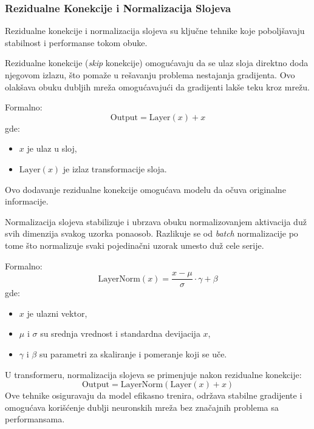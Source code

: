 \documentclass[12pt]{article}
\begin{document}
   \subsubsection*{Rezidualne Konekcije i Normalizacija Slojeva}

   Rezidualne konekcije i normalizacija slojeva su ključne tehnike koje poboljšavaju 
   stabilnost i performanse tokom obuke.

   Rezidualne konekcije (\textit{skip} konekcije) omogućavaju da se ulaz sloja direktno 
   doda njegovom izlazu, što pomaže u rešavanju problema nestajanja gradijenta. Ovo 
   olakšava obuku dubljih mreža omogućavajući da gradijenti lakše teku kroz mrežu.

   Formalno:
   \[
   \text{Output} = \text{Layer}(x) + x
   \]
   gde:
   \begin{itemize}
      \vspace{-0.5cm}
      \item \( x \) je ulaz u sloj,
      \item \( \text{Layer}(x) \) je izlaz transformacije sloja.
   \end{itemize}

   Ovo dodavanje rezidualne konekcije omogućava modelu da očuva originalne informacije.
   
   Normalizacija slojeva stabilizuje i ubrzava obuku normalizovanjem aktivacija duž 
   svih dimenzija svakog uzorka ponaosob. Razlikuje se od \textit{batch} normalizacije po 
   tome što normalizuje svaki pojedinačni uzorak umesto duž cele serije.

   Formalno:
   \[
   \text{LayerNorm}(x) = \frac{x - \mu}{\sigma} \cdot \gamma + \beta
   \]
   gde:
   \begin{itemize}
      \vspace{-0.5cm}
      \setlength\itemsep{0.2em} %
      \item \( x \) je ulazni vektor,
      \item \( \mu \) i \( \sigma \) su srednja vrednost i standardna devijacija \( x \),
      \item \( \gamma \) i \( \beta \) su parametri za skaliranje i pomeranje koji se uče.
   \end{itemize}

   U transformeru, normalizacija slojeva se primenjuje nakon rezidualne konekcije:
   \[
   \text{Output} = \text{LayerNorm}(\text{Layer}(x) + x)
   \]  
   Ove tehnike osiguravaju da model efikasno trenira, održava stabilne gradijente i 
   omogućava korišćenje dublji neuronskih mreža bez značajnih problema sa performansama.
\end{document}
